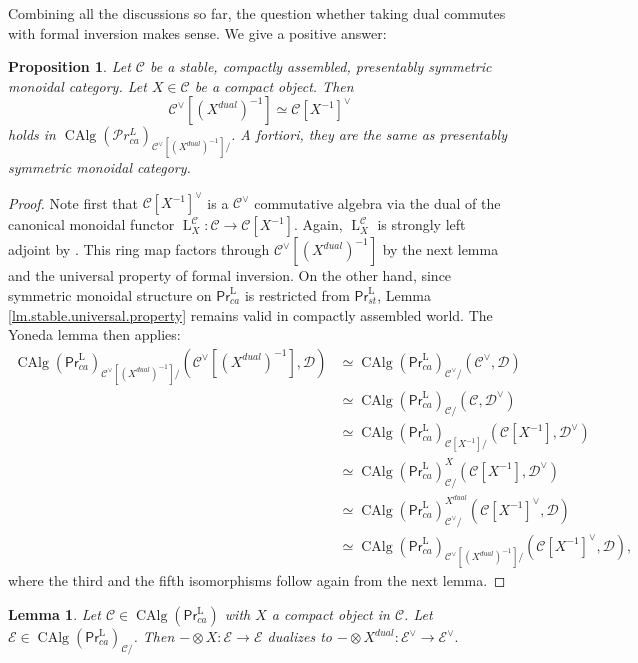\documentclass{article}
\newtheorem{lm}[thm]{Lemma}
\newtheorem{prop}[thm]{Proposition}
\theoremstyle{definition}
\newcommand{\on}{\operatorname}
\newcommand{\PrL}{\mathsf{Pr}^\mathrm{L} }
\begin{document}
Combining all the discussions so far, the question whether taking dual commutes with formal inversion makes sense. We give a positive answer:
\begin{prop}\label{formal.inversion.prop}
Let $\mathcal{C}$ be a stable, compactly assembled, presentably symmetric monoidal category. Let $X\in\mathcal{C}$ be a compact object. Then \[\mathcal{C}^\vee[(X^{dual})^{-1}]\simeq \mathcal{C}[X^{-1}]^\vee\]
holds in $\on{CAlg}(\mathcal{P}r^L_{ca})_{\mathcal{C}^\vee[(X^{dual})^{-1}]/}$. A fortiori, they are the same as presentably symmetric monoidal category.
\end{prop}
\begin{proof}
Note first that $\mathcal{C}[X^{-1}]^\vee$ is a $\mathcal{C}^\vee$ commutative algebra via the dual of the canonical monoidal functor $\on{L}_X^\mathcal{C}:\mathcal{C}\rightarrow\mathcal{C}[X^{-1}]$. Again, $\on{L}_X^\mathcal{C}$ is strongly left adjoint by \cite[Lemma 1.5.2]{AI}. This ring map factors through $\mathcal{C}^\vee[(X^{dual})^{-1}]$ by the next lemma and the universal property of formal inversion. On the other hand, since symmetric monoidal structure on $\PrL_{ca}$ is restricted from $\PrL_{st}$, Lemma \ref{lm.stable.universal.property} remains valid in compactly assembled world. The Yoneda lemma then applies:\[
\begin{aligned}
\on{CAlg}(\PrL_{ca})_{\mathcal{C}^\vee[(X^{dual})^{-1}]/}(\mathcal{C}^\vee[(X^{dual})^{-1}],\mathcal{D})&\simeq \on{CAlg}(\PrL_{ca})_{\mathcal{C}^\vee/}(\mathcal{C}^\vee,\mathcal{D})\\
&\simeq \on{CAlg}(\PrL_{ca})_{\mathcal{C}/}(\mathcal{C},\mathcal{D}^\vee)\\
&\simeq \on{CAlg}(\PrL_{ca})_{\mathcal{C}[X^{-1}]/}(\mathcal{C}[X^{-1}],\mathcal{D}^\vee)\\
&\simeq \on{CAlg}(\PrL_{ca})^X_{\mathcal{C}/}(\mathcal{C}[X^{-1}],\mathcal{D}^\vee)\\
&\simeq \on{CAlg}(\PrL_{ca})^{X^{dual}}_{\mathcal{C}^\vee/}(\mathcal{C}[X^{-1}]^\vee,\mathcal{D})\\
&\simeq \on{CAlg}(\PrL_{ca})_{\mathcal{C}^\vee[(X^{dual})^{-1}]/}(\mathcal{C}[X^{-1}]^\vee,\mathcal{D}),
\end{aligned}\]
where the third and the fifth isomorphisms follow again from the next lemma.
\end{proof}
\begin{lm}
Let  $\mathcal{C}\in\on{CAlg}(\PrL_{ca})$ with $X$ a compact object in $\mathcal{C}$. Let $\mathcal{E}\in\on{CAlg}(\PrL_{ca})_{\mathcal{C}/}$. Then $-\otimes X:\mathcal{E}\rightarrow\mathcal{E}$ dualizes to $-\otimes X^{dual}:\mathcal{E}^\vee\rightarrow\mathcal{E}^\vee.$
\end{lm}
\end{document}
